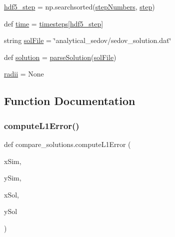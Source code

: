 \begin{DoxyCompactItemize}
\item 
\mbox{\hyperlink{namespacecompare__solutions_a61c96294f04326c4cd2cd3edaf20b9dc}{hdf5\+\_\+step}} = np.\+searchsorted(\mbox{\hyperlink{namespacecompare__solutions_a2a151e40a9edaf958d726ac3999ac374}{step\+Numbers}}, \mbox{\hyperlink{namespacecompare__solutions_a9e016da601f62bd2e5d85bce6a22bfb6}{step}})
\item 
def \mbox{\hyperlink{namespacecompare__solutions_a83a9f408c6948f95c816240ca5e5bf65}{time}} = \mbox{\hyperlink{namespacecompare__solutions_a0c934f0f38e7ab253392939e3068c05e}{timesteps}}\mbox{[}\mbox{\hyperlink{namespacecompare__solutions_a61c96294f04326c4cd2cd3edaf20b9dc}{hdf5\+\_\+step}}\mbox{]}
\item 
string \mbox{\hyperlink{namespacecompare__solutions_a574fdc0a536d960cd99228d27a397110}{sol\+File}} = \char`\"{}analytical\+\_\+sedov/sedov\+\_\+solution.\+dat\char`\"{}
\item 
def \mbox{\hyperlink{namespacecompare__solutions_a2550d71d0847020456f71310fbe7a3c3}{solution}} = \mbox{\hyperlink{namespacecompare__solutions_ae6db53243984030adbac586e151de969}{parse\+Solution}}(\mbox{\hyperlink{namespacecompare__solutions_a574fdc0a536d960cd99228d27a397110}{sol\+File}})
\item 
\mbox{\hyperlink{namespacecompare__solutions_a508c82664e34bc1a18ed0b2366a40698}{radii}} = None
\end{DoxyCompactItemize}


\subsection{Function Documentation}
\mbox{\label{namespacecompare__solutions_a2fe90bcceeb8a3e4204af4eea023ee0d}} 
\subsubsection{\texorpdfstring{compute\+L1\+Error()}{computeL1Error()}}
{\footnotesize\ttfamily def compare\+\_\+solutions.\+compute\+L1\+Error (\begin{DoxyParamCaption}\item[{}]{x\+Sim,  }\item[{}]{y\+Sim,  }\item[{}]{x\+Sol,  }\item[{}]{y\+Sol }\end{DoxyParamCaption})}

